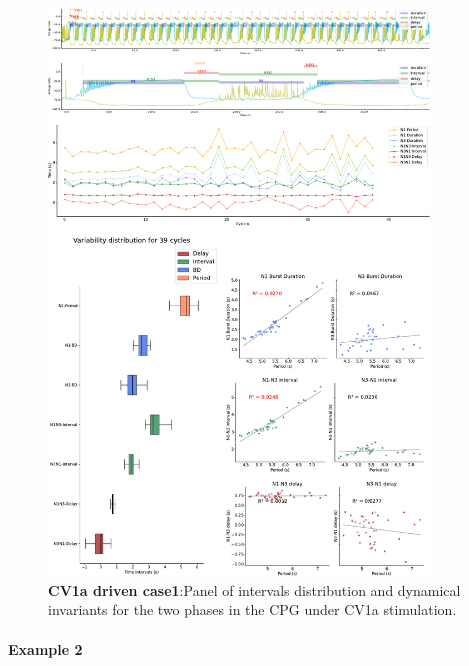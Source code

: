 \begin{figure}[htbp]
	\centering
	\includegraphics[width=0.9\textwidth]{./invariants/data/SUSSEX/CV1a_driven1/images/2phases/panel_with_intervals.pdf}
	\caption{\textbf{CV1a driven case1}:Panel of intervals distribution and dynamical invariants for the two phases in the CPG under CV1a stimulation.}
	\label{fig:cv1a 1 2phases}
\end{figure}

%



\paragraph{Example 2}


